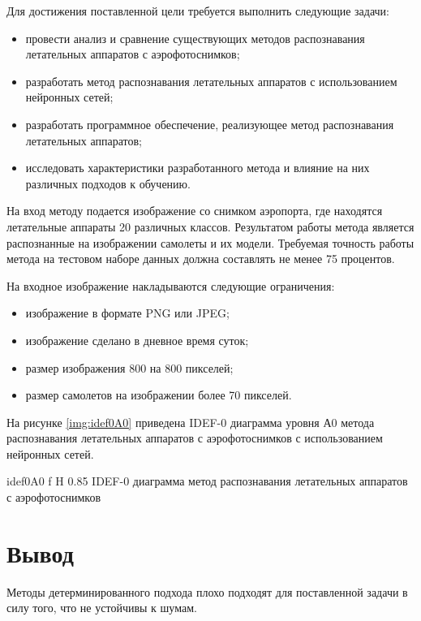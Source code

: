 Для достижения поставленной цели требуется выполнить следующие задачи:
\begin{itemize}
	\item провести анализ и сравнение существующих методов распознавания летательных аппаратов с аэрофотоснимков;
	\item разработать метод распознавания летательных аппаратов с использованием нейронных сетей;
	\item разработать программное обеспечение, реализующее метод распознавания летательных аппаратов;
	\item исследовать характеристики разработанного метода и влияние на них различных подходов к обучению.
\end{itemize}

На вход методу подается изображение со снимком аэропорта, где находятся летательные аппараты 20 различных классов. Результатом работы метода является распознанные на изображении самолеты и их модели. Требуемая точность работы метода на тестовом наборе данных должна составлять не менее 75 процентов.

На входное изображение накладываются следующие ограничения:
\begin{itemize}
	\item изображение в формате PNG или JPEG;
	\item изображение сделано в дневное время суток;
	\item размер изображения 800 на 800 пикселей;
	\item размер самолетов на изображении более 70 пикселей.
\end{itemize}

На рисунке \ref{img:idef0A0} приведена IDEF-0 диаграмма уровня А0 метода распознавания летательных аппаратов с аэрофотоснимков с использованием нейронных сетей.

{idef0A0} %
{f} %
{H} %
{0.85\textwidth} %
{IDEF-0 диаграмма метод распознавания летательных аппаратов с аэрофотоснимков} %

\section{Вывод}

Методы детерминированного подхода плохо подходят для поставленной задачи в силу того, что не устойчивы к шумам.

